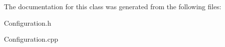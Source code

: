 The documentation for this class was generated from the following files\+:\begin{DoxyCompactItemize}
\item 
Configuration.\+h\item 
Configuration.\+cpp\end{DoxyCompactItemize}
